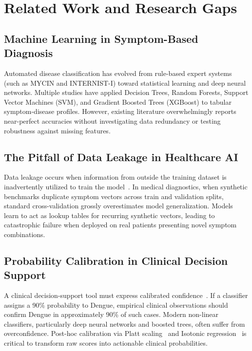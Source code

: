 \section{Related Work and Research Gaps}
\label{sec:related_work}

\subsection{Machine Learning in Symptom-Based Diagnosis}
Automated disease classification has evolved from rule-based expert systems (such as MYCIN and INTERNIST-I) toward statistical learning and deep neural networks. Multiple studies have applied Decision Trees, Random Forests, Support Vector Machines (SVM), and Gradient Boosted Trees (XGBoost) to tabular symptom-disease profiles. However, existing literature overwhelmingly reports near-perfect accuracies without investigating data redundancy or testing robustness against missing features.

\subsection{The Pitfall of Data Leakage in Healthcare AI}
Data leakage occurs when information from outside the training dataset is inadvertently utilized to train the model~\cite{kapoor2023leakage}. In medical diagnostics, when synthetic benchmarks duplicate symptom vectors across train and validation splits, standard cross-validation grossly overestimates model generalization. Models learn to act as lookup tables for recurring synthetic vectors, leading to catastrophic failure when deployed on real patients presenting novel symptom combinations.

\subsection{Probability Calibration in Clinical Decision Support}
A clinical decision-support tool must express calibrated confidence~\cite{guo2017calibration}. If a classifier assigns a 90\% probability to Dengue, empirical clinical observations should confirm Dengue in approximately 90\% of such cases. Modern non-linear classifiers, particularly deep neural networks and boosted trees, often suffer from overconfidence. Post-hoc calibration via Platt scaling~\cite{platt1999probabilistic} and Isotonic regression~\cite{zadrozny2002transforming} is critical to transform raw scores into actionable clinical probabilities.
